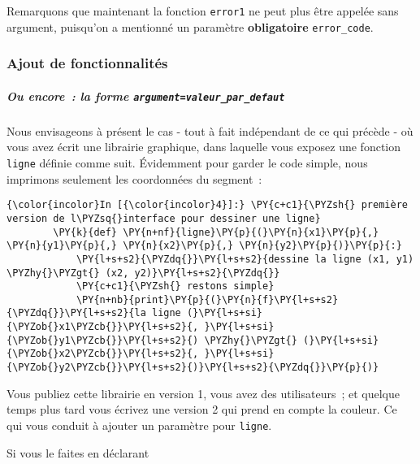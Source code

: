     Remarquons que maintenant la fonction \texttt{error1} ne peut plus être
appelée sans argument, puisqu'on a mentionné un paramètre
\textbf{obligatoire} \texttt{error\_code}.

    \hypertarget{ajout-de-fonctionnalituxe9s}{%
\subsubsection{Ajout de
fonctionnalités}\label{ajout-de-fonctionnalituxe9s}}

    \hypertarget{ou-encore-la-forme-argumentvaleur_par_defaut}{%
\subparagraph{\texorpdfstring{Ou encore~: la forme
\texttt{argument=valeur\_par\_defaut}}{Ou encore~: la forme argument=valeur\_par\_defaut}}\label{ou-encore-la-forme-argumentvaleur_par_defaut}}

    Nous envisageons à présent le cas - tout à fait indépendant de ce qui
précède - où vous avez écrit une librairie graphique, dans laquelle vous
exposez une fonction \texttt{ligne} définie comme suit. Évidemment pour
garder le code simple, nous imprimons seulement les coordonnées du
segment~:

    \begin{Verbatim}[commandchars=\\\{\},frame=single,framerule=0.3mm,rulecolor=\color{cellframecolor}]
{\color{incolor}In [{\color{incolor}4}]:} \PY{c+c1}{\PYZsh{} première version de l\PYZsq{}interface pour dessiner une ligne}
        \PY{k}{def} \PY{n+nf}{ligne}\PY{p}{(}\PY{n}{x1}\PY{p}{,} \PY{n}{y1}\PY{p}{,} \PY{n}{x2}\PY{p}{,} \PY{n}{y2}\PY{p}{)}\PY{p}{:}
            \PY{l+s+s2}{\PYZdq{}}\PY{l+s+s2}{dessine la ligne (x1, y1) \PYZhy{}\PYZgt{} (x2, y2)}\PY{l+s+s2}{\PYZdq{}}
            \PY{c+c1}{\PYZsh{} restons simple}
            \PY{n+nb}{print}\PY{p}{(}\PY{n}{f}\PY{l+s+s2}{\PYZdq{}}\PY{l+s+s2}{la ligne (}\PY{l+s+si}{\PYZob{}x1\PYZcb{}}\PY{l+s+s2}{, }\PY{l+s+si}{\PYZob{}y1\PYZcb{}}\PY{l+s+s2}{) \PYZhy{}\PYZgt{} (}\PY{l+s+si}{\PYZob{}x2\PYZcb{}}\PY{l+s+s2}{, }\PY{l+s+si}{\PYZob{}y2\PYZcb{}}\PY{l+s+s2}{)}\PY{l+s+s2}{\PYZdq{}}\PY{p}{)}
\end{Verbatim}


    Vous publiez cette librairie en version 1, vous avez des utilisateurs~;
et quelque temps plus tard vous écrivez une version 2 qui prend en
compte la couleur. Ce qui vous conduit à ajouter un paramètre pour
\texttt{ligne}.

    Si vous le faites en déclarant

\begin{Shaded}
\begin{Highlighting}[frame=lines,framerule=0.6mm,rulecolor=\color{asisframecolor}]
\end{Highlighting}
\end{Shaded}

